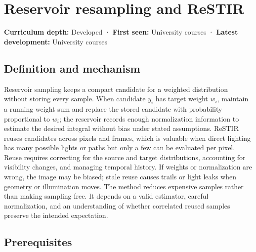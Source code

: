 \hypertarget{appendix-68be451b78b1}{}\label{referencestart:appendix-68be451b78b1}
\section{Reservoir resampling and ReSTIR}\label{appendix-68be451b78b1-reservoir-resampling-and-restir}

\hypertarget{appendix-68be451b78b1-reservoir-resampling-and-restir}{}

\textbf{Curriculum depth:} Developed · \textbf{First seen:} University courses · \textbf{Latest development:} University courses

\begin{allmightroledefinition}

\subsection{Definition and mechanism}\label{appendix-68be451b78b1-definition-and-mechanism}

\hypertarget{appendix-68be451b78b1-definition-and-mechanism}{}

Reservoir sampling keeps a compact candidate for a weighted distribution without storing every sample. When candidate \(y_i\) has target weight \(w_i\), maintain a running weight sum and replace the stored candidate with probability proportional to \(w_i\); the reservoir records enough normalization information to estimate the desired integral without bias under stated assumptions. ReSTIR reuses candidates across pixels and frames, which is valuable when direct lighting has many possible lights or paths but only a few can be evaluated per pixel. Reuse requires correcting for the source and target distributions, accounting for visibility changes, and managing temporal history. If weights or normalization are wrong, the image may be biased; stale reuse causes trails or light leaks when geometry or illumination moves. The method reduces expensive samples rather than making sampling free. It depends on a valid estimator, careful normalization, and an understanding of whether correlated reused samples preserve the intended expectation.

\end{allmightroledefinition}

\subsection{Prerequisites}\label{appendix-68be451b78b1-prerequisites}

